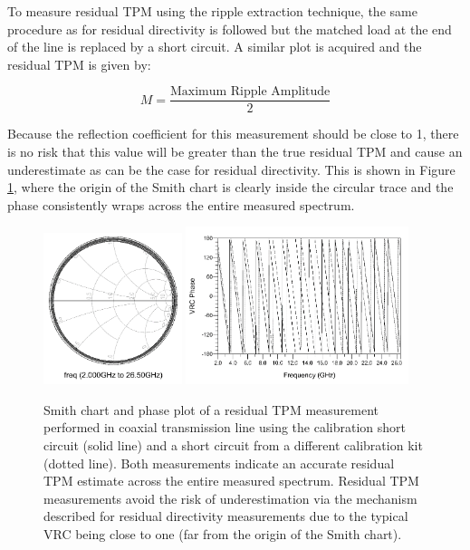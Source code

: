 \documentclass[../thesis/thesis.tex]{subfiles}
\begin{document}
\begin{refsection}
To measure residual TPM using the ripple extraction technique, the same procedure as for residual directivity is followed but the matched load at the end of the line is replaced by a short circuit. A similar plot is acquired and the residual TPM is given by:

\begin{equation}
M = \frac{\textrm{Maximum Ripple Amplitude}}{2}
\end{equation}

Because the reflection coefficient for this measurement should be close to 1, there is no risk that this value will be greater than the true residual TPM and cause an underestimate as can be the case for residual directivity. This is shown in Figure \ref{ch4_fig_tpm}, where the origin of the Smith chart is clearly inside the circular trace and the phase consistently wraps across the entire measured spectrum.

\begin{figure}
	\centering
	\includegraphics[width=0.36\textwidth]{tpm_smith.png}
	\hfill
	\includegraphics[width=0.58\textwidth]{tpm_xy.png}
	\caption{Smith chart and phase plot of a residual TPM measurement performed in coaxial transmission line using the calibration short circuit (solid line) and a short circuit from a different calibration kit (dotted line). Both measurements indicate an accurate residual TPM estimate across the entire measured spectrum. Residual TPM measurements avoid the risk of underestimation via the mechanism described for residual directivity measurements due to the typical VRC being close to one (far from the origin of the Smith chart).}
	\label{ch4_fig_tpm}
\end{figure}


\end{refsection}
\end{document}
